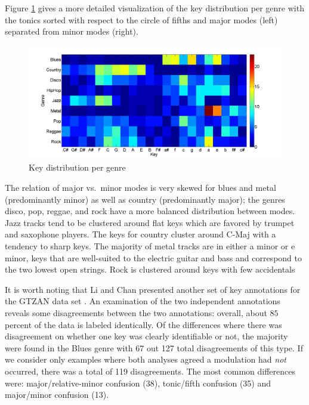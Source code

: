 \documentclass{article}
\begin{document}
Figure \ref{fig:KeyDistributionPerGenre} gives a more detailed visualization of the key distribution per genre with the tonics sorted with respect to the circle of fifths and major modes (left) separated from minor modes (right). 
\begin{figure}
    \includegraphics[scale=.2]{graph/key_distribution_colour_legend}
	\caption{Key distribution per genre}
	\label{fig:KeyDistributionPerGenre}
\end{figure}
The relation of major vs.\ minor modes is very skewed for blues and metal (predominantly minor) as well as country (predominantly major); the genres disco, pop, reggae, and rock have a more balanced distribution between modes. Jazz tracks tend to be clustered around flat keys which are favored by trumpet and saxophone players. The keys for country cluster around C-Maj with a tendency to sharp keys. The majority of metal tracks are in either a minor or e minor, keys that are well-suited to the electric guitar and bass and correspond to the two lowest open strings. Rock is clustered around keys with few accidentals


It is worth noting that Li and Chan presented another set of key annotations for the GTZAN data set \cite{li_genre_2011}. An examination of the two independent annotations reveals some disagreements between the two annotations: overall, about $85$ percent of the data is labeled identically. 
Of the differences where there was disagreement on whether one key was clearly identifiable or not, the majority were found in the Blues genre with 67 out 127 total disagreements of this type. If we consider only examples where both analyses agreed a modulation had \textit{not} occurred, there was a total of 119 disagreements. The most common differences were: major/relative-minor confusion (38), tonic/fifth confusion (35) and major/minor confusion (13).
\end{document}
